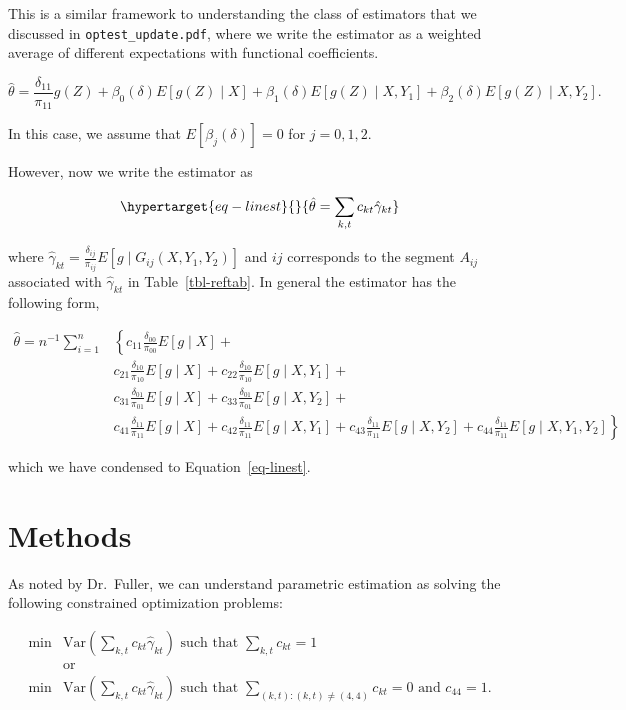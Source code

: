 \documentclass[
  letterpaper,
  DIV=11,
  numbers=noendperiod]{scrartcl}
\newcommand{\Var}{{\text{Var}}}
\begin{document}
This is a similar framework to understanding the class of estimators
that we discussed in \verb|optest_update.pdf|, where we write the
estimator as a weighted average of different expectations with
functional coefficients.

\[\hat \theta = \frac{\delta_{11}}{\pi_{11}}g(Z) + \beta_0(\delta)E[g(Z)
\mid X] + \beta_1(\delta)E[g(Z) \mid X, Y_1] + \beta_2(\delta) E[g(Z)
\mid X, Y_2].\]

In this case, we assume that \(E[\beta_j(\delta)] = 0\) for
\(j = 0, 1, 2\).

However, now we write the estimator as

\begin{equation}\protect\hypertarget{eq-linest}{}{\hat \theta = \sum_{k,t} c_{kt}\hat \gamma_{kt}}\label{eq-linest}\end{equation}

where
\(\hat \gamma_{kt} = \frac{\delta_{ij}}{\pi_{ij}}E[g \mid G_{ij}(X, Y_1, Y_2)]\)
and \(ij\) corresponds to the segment \(A_{ij}\) associated with
\(\hat \gamma_{kt}\) in Table~\ref{tbl-reftab}. In general the estimator
has the following form,

\begin{align*}
\hat \theta = n^{-1} \sum_{i = 1}^n 
  &\left\{c_{11}\frac{\delta_{00}}{\pi_{00}} E[g \mid X]+ \right.\\
  &c_{21}\frac{\delta_{10}}{\pi_{10}} E[g \mid X]+ 
  c_{22}\frac{\delta_{10}}{\pi_{10}} E[g \mid X, Y_1]+ \\
  &c_{31}\frac{\delta_{01}}{\pi_{01}} E[g \mid X]+ 
  c_{33}\frac{\delta_{01}}{\pi_{01}} E[g \mid X, Y_2]+ \\
  &c_{41}\frac{\delta_{11}}{\pi_{11}} E[g \mid X]+ 
  c_{42}\frac{\delta_{11}}{\pi_{11}} E[g \mid X, Y_1]+
  c_{43}\frac{\delta_{11}}{\pi_{11}} E[g \mid X, Y_2]+
  \left.c_{44}\frac{\delta_{11}}{\pi_{11}} E[g \mid X, Y_1, Y_2]\right\}
\end{align*}

which we have condensed to Equation~\ref{eq-linest}.

\hypertarget{sec-methods}{%
\section{Methods}\label{sec-methods}}

As noted by Dr.~Fuller, we can understand parametric estimation as
solving the following constrained optimization problems:

\begin{align*}
  \min &\Var\left(\sum_{k, t} c_{kt} \hat \gamma_{kt}\right) \text{ such that } 
  \sum_{k,t} c_{kt} = 1 \\
       &\text{or} \\
  \min &\Var\left(\sum_{k, t} c_{kt} \hat \gamma_{kt}\right) \text{ such that } 
  \sum_{(k,t): (k,t) \neq (4, 4)} c_{kt} = 0 \text{ and } c_{44} = 1. \\
\end{align*}
\end{document}
